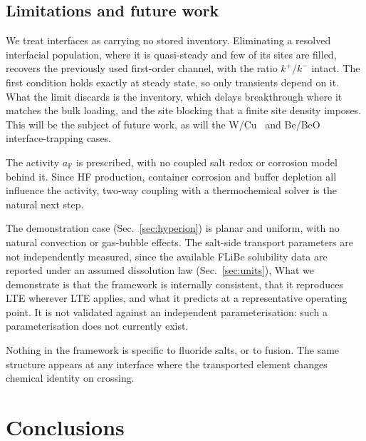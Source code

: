 \documentclass[5p]{elsarticle}
\begin{document}
\subsection{Limitations and future work}
\label{sec:limitations}

We treat interfaces as carrying no stored inventory.
Eliminating a resolved interfacial population, where it is quasi-steady and few of its sites are filled, recovers the previously used first-order channel, with the ratio $k^{+}/k^{-}$ intact.
The first condition holds exactly at steady state, so only transients depend on it.
What the limit discards is the inventory, which delays breakthrough where it matches the bulk loading, and the site blocking that a finite site density imposes.
This will be the subject of future work, as will the W/Cu~\cite{silva-solis_hydrogen_2026} and Be/BeO~\cite{hodille_molecular_2022} interface-trapping cases.

The activity $a_\mathrm{F}$ is prescribed, with no coupled salt redox or corrosion model behind it.
Since HF production, container corrosion and buffer depletion all influence the activity, two-way coupling with a thermochemical solver is the natural next step.

The demonstration case (Sec.~\ref{sec:hyperion}) is planar and uniform, with no natural convection or gas-bubble effects.
The salt-side transport parameters are not independently measured, since the available FLiBe solubility data are reported under an assumed dissolution law (Sec.~\ref{sec:units}),
What we demonstrate is that the framework is internally consistent, that it reproduces LTE wherever LTE applies, and what it predicts at a representative operating point.
It is not validated against an independent parameterisation: such a parameterisation does not currently exist.

Nothing in the framework is specific to fluoride salts, or to fusion.
The same structure appears at any interface where the transported element changes chemical identity on crossing.

\section{Conclusions}
\label{sec:conclusions}
\end{document}
